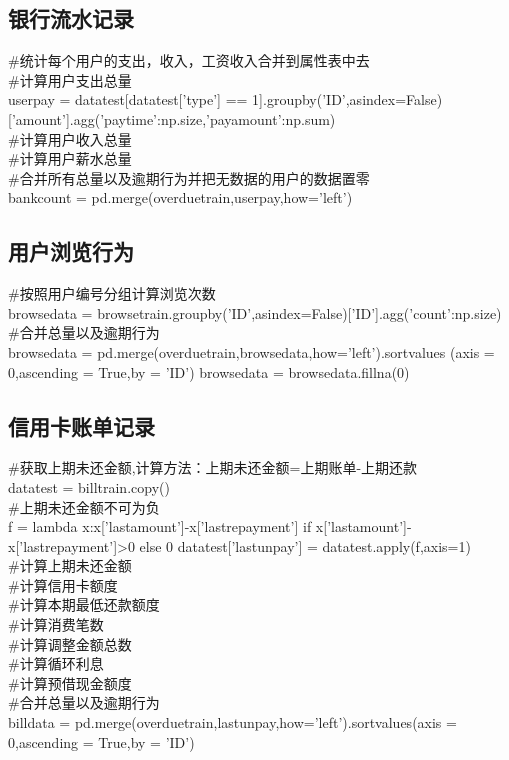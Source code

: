 \documentclass{article}
\begin{document}
\subsection{银行流水记录}

\#统计每个用户的支出，收入，工资收入合并到属性表中去
\\ \#计算用户支出总量
\\user\textunderscore pay = datatest[datatest['type'] ==
1].groupby('ID',as\textunderscore index=False)['amount'].agg({'pay\textunderscore time':np.size,'pay\textunderscore amount':np.sum})
\\ \#计算用户收入总量
\\ \#计算用户薪水总量
\\ \#合并所有总量以及逾期行为并把无数据的用户的数据置零
\\bank\textunderscore count = pd.merge(overdue\textunderscore train,user\textunderscore pay,how='left')

\subsection{用户浏览行为}
\#按照用户编号分组计算浏览次数
\\browse\textunderscore data = 
browse\textunderscore train.groupby('ID',as\textunderscore index=False)['ID'].agg({'count':np.size})
\\ \#合并总量以及逾期行为
\\browse\textunderscore data = pd.merge(overdue\textunderscore train,browse\textunderscore data,how='left').sort\textunderscore values
(axis = 0,ascending = True,by = 'ID')
browse\textunderscore data = browse\textunderscore data.fillna(0)



\subsection{信用卡账单记录}
\#获取上期未还金额,计算方法：上期未还金额=上期账单-上期还款
\\datatest = bill\textunderscore train.copy()
\\ \#上期未还金额不可为负
\\f = lambda x:x['last\textunderscore amount']-x['last\textunderscore repayment'] 
if x['last\textunderscore amount']-x['last\textunderscore repayment']>0 else 0
datatest['last\textunderscore unpay'] = datatest.apply(f,axis=1)
\\ \#计算上期未还金额
\\ \#计算信用卡额度
\\ \#计算本期最低还款额度
\\ \#计算消费笔数
\\ \#计算调整金额总数
\\ \#计算循环利息
\\ \#计算预借现金额度
\\ \#合并总量以及逾期行为
\\bill\textunderscore data = pd.merge(overdue\textunderscore train,last\textunderscore unpay,how='left').sort\textunderscore values(axis = 0,ascending = True,by = 'ID')
\end{document}
